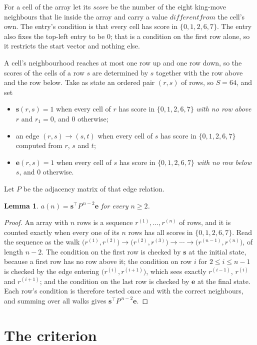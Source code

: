 \documentclass[11pt,a4paper]{article}
\theoremstyle{plain}
\newtheorem{lemma}[theorem]{Lemma}
\theoremstyle{definition}
\begin{document}
For a cell of the array let its \emph{score} be the number of the eight king-move neighbours that lie inside
the array and carry a value $different from$ the cell's own. The entry's condition is that every cell
has score in $\{0,1,2,6,7\}$. The entry also fixes the top-left entry to be $0$; that is a condition on the first row alone, so it restricts the start vector and nothing else.

A cell's neighbourhood reaches at most one row up and one row down, so the scores of the
cells of a row $s$ are determined by $s$ together with the row above and the row below.
Take as state an ordered pair $(r,s)$ of rows, so $S=64$, and set
\begin{itemize}
\item $\mathbf{s}(r,s)=1$ when every cell of $r$ has score in $\{0,1,2,6,7\}$ \emph{with no row
above $r$} and $r_1=0$, and $0$ otherwise;
\item an edge $(r,s)\to(s,t)$ when every cell of $s$ has score in $\{0,1,2,6,7\}$ computed from
$r$, $s$ and $t$;
\item $\mathbf{e}(r,s)=1$ when every cell of $s$ has score in $\{0,1,2,6,7\}$ \emph{with no row
below $s$}, and $0$ otherwise.
\end{itemize}
Let $P$ be the adjacency matrix of that edge relation.

\begin{lemma}\label{lem:walk}
$a(n)=\mathbf{s}^{\!\top}P^{\,n-2}\mathbf{e}$ for every $n\ge2$.
\end{lemma}

\begin{proof}
An array with $n$ rows is a sequence $r^{(1)},\dots,r^{(n)}$ of rows, and it is counted
exactly when every one of its $n$ rows has all scores in $\{0,1,2,6,7\}$. Read the sequence as the
walk $\bigl(r^{(1)},r^{(2)}\bigr)\to\bigl(r^{(2)},r^{(3)}\bigr)\to\cdots\to
\bigl(r^{(n-1)},r^{(n)}\bigr)$, of length $n-2$. The condition on the first row is
checked by $\mathbf{s}$ at the initial state, because a first row has no row above it; the
condition on row $i$ for $2\le i\le n-1$ is checked by the edge entering
$\bigl(r^{(i)},r^{(i+1)}\bigr)$, which sees exactly $r^{(i-1)}$, $r^{(i)}$ and
$r^{(i+1)}$; and the condition on the last row is checked by $\mathbf{e}$ at the final
state. Each row's condition is therefore tested once and with the correct neighbours, and
summing over all walks gives $\mathbf{s}^{\!\top}P^{\,n-2}\mathbf{e}$.
\end{proof}

\section{The criterion}
\end{document}

